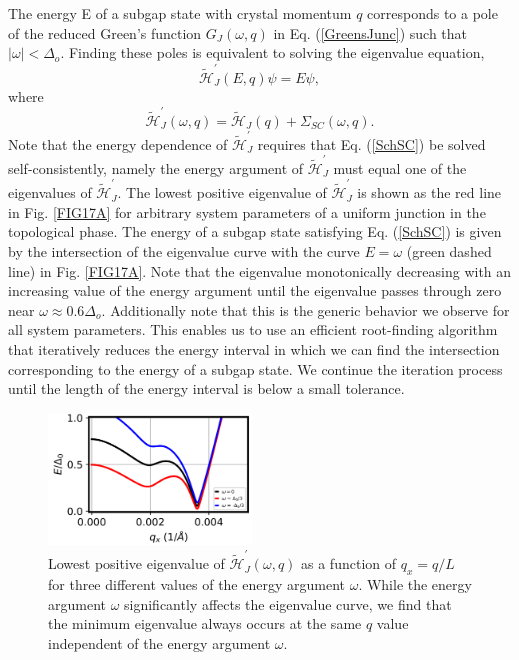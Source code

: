 \documentclass[twocolumn,aps,prb,nofootinbib]{revtex4-2}
\begin{document}
The energy E of a subgap state with crystal momentum $q$ corresponds to a pole of the reduced Green's function $G_J(\omega,q)$ in Eq. (\ref{GreensJunc}) such that $|\omega| < \Delta_o$. Finding these poles is equivalent to solving the eigenvalue equation,
\begin{equation}
\widetilde{\mathcal{H}}_{J}^{\prime}( E,q)\psi = E\psi, \label{SchSC}
\end{equation}
where
\begin{equation}
    \widetilde{\mathcal{H}}_{J}^{\prime}( \omega,q) = 
    \widetilde{\mathcal{H}}_J(q) 
    + \Sigma_{SC}(\omega,q).
\end{equation}
Note that the energy dependence of $\widetilde{\mathcal{H}}_{J}^{\prime}$ requires that Eq. (\ref{SchSC}) be solved self-consistently, namely the energy argument of $\widetilde{\mathcal{H}}_{J}^{\prime}$ must equal one of the eigenvalues of $\widetilde{\mathcal{H}}_{J}^{\prime}$. The lowest positive eigenvalue of $\widetilde{\mathcal{H}}_{J}^{\prime}$ is shown as the red line in Fig. \ref{FIG17A} for arbitrary system parameters of a uniform junction in the topological phase.
The energy of a subgap state satisfying Eq. (\ref{SchSC}) is given by the intersection of the eigenvalue curve with the curve $E = \omega$ (green dashed line) in Fig. \ref{FIG17A}. Note that the eigenvalue monotonically decreasing with an increasing value of the energy argument until the eigenvalue passes through zero near $\omega \approx 0.6 \Delta_o$. Additionally note that this is the generic behavior we observe for all system parameters. This enables us to use an efficient root-finding algorithm that iteratively reduces the energy interval in which we can find the intersection corresponding to the energy of a subgap state. We continue the iteration process until the length of the energy interval is below a small tolerance.

\begin{figure}[t]
\begin{center}
\includegraphics[width=0.48\textwidth]{Fig18_Appendix_C.png}
\end{center}
\vspace{-0.5cm}
\caption{Lowest positive eigenvalue of $\widetilde{\mathcal{H}}_{J}^{\prime}(\omega,q)$ as a function of $q_x = q/L$ for three different values of the energy argument $\omega$. While the energy argument $\omega$ significantly affects the eigenvalue curve, we find that the minimum eigenvalue always occurs at the same $q$ value independent of the energy argument $\omega$.}
\label{FIG18A}
\vspace{-1mm}
\end{figure}
\end{document}
